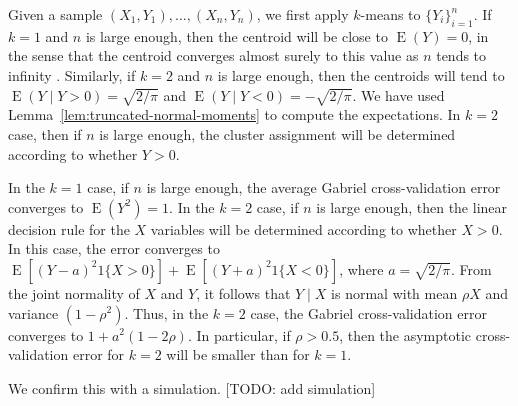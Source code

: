 \documentclass[11pt]{article}
\newcommand{\E}{\operatorname{E}}
\begin{document}
Given a sample $(X_1, Y_1), \dotsc, (X_n, Y_n)$, we first apply $k$-means to
$\{ Y_i \}_{i=1}^{n}$.  If $k = 1$ and $n$ is large enough, then the centroid
will be close to $\E(Y) = 0$, in the sense that the centroid converges almost
surely to this value as $n$ tends to infinity \citep{pollard1981strong}.
Similarly, if $k = 2$ and $n$ is large enough, then the centroids will tend to
$\E(Y \mid Y > 0) = \sqrt{2/\pi}$ and $\E(Y \mid Y < 0) = -\sqrt{2/\pi}$.  We
have used Lemma~\ref{lem:truncated-normal-moments} to compute the
expectations.  In $k = 2$ case, then if $n$ is large enough, the cluster
assignment will be determined according to whether $Y > 0$.

In the $k = 1$ case, if $n$ is large enough, the average Gabriel
cross-validation error converges to $\E(Y^2) = 1$. In the $k = 2$ case, if $n$
is large enough, then the linear decision rule for the $X$ variables will be
determined according to whether $X > 0$.  In this case, the error converges to
$\E[(Y - a)^2 1\{ X > 0\}] + \E[(Y + a)^2 1\{X < 0\}]$, where
$a = \sqrt{2/\pi}$.  From the joint normality of $X$ and $Y$, it follows that $Y
\mid X$ is normal with mean $\rho X$ and variance $(1 - \rho^2)$.   Thus, in
the $k = 2$ case, the Gabriel cross-validation error converges to $1 + a^2 (1
- 2 \rho)$.  In particular, if $\rho > 0.5$, then the asymptotic
cross-validation error for $k = 2$ will be smaller than for $k = 1$.

We confirm this with a simulation.  [TODO: add simulation]





\end{document}
